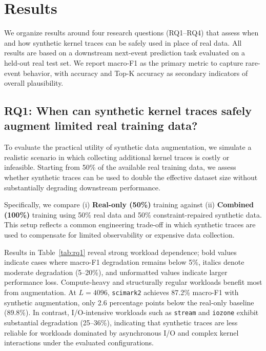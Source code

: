 \section{Results}
\label{sec:results}

We organize results around four research questions (RQ1--RQ4) that assess when and how synthetic kernel traces can be safely used in place of real data. All results are based on a downstream next-event prediction task evaluated on a held-out real test set. We report macro-F1 as the primary metric to capture rare-event behavior, with accuracy and Top-K accuracy as secondary indicators of overall plausibility.



\subsection{RQ1: When can synthetic kernel traces safely augment limited real training data?}
\label{sec:rq1}

To evaluate the practical utility of synthetic data augmentation, we simulate a realistic scenario in which collecting additional kernel traces is costly or infeasible. Starting from 50\% of the available real training data, we assess whether synthetic traces can be used to double the effective dataset size without substantially degrading downstream performance.

Specifically, we compare (i) \textbf{Real-only (50\%)} training against (ii) \textbf{Combined (100\%)} training using 50\% real data and 50\% constraint-repaired synthetic data. This setup reflects a common engineering trade-off in which synthetic traces are used to compensate for limited observability or expensive data collection.

Results in Table~\ref{tab:rq1} reveal strong workload dependence; bold values indicate cases where macro-F1 degradation remains below 5\%, italics denote moderate degradation (5--20\%), and unformatted values indicate larger performance loss.
 Compute-heavy and structurally regular workloads benefit most from augmentation. At $L=4096$, \texttt{scimark2} achieves 87.2\% macro-F1 with synthetic augmentation, only 2.6 percentage points below the real-only baseline (89.8\%). In contrast, I/O-intensive workloads such as \texttt{stream} and \texttt{iozone} exhibit substantial degradation (25--36\%), indicating that synthetic traces are less reliable for workloads dominated by asynchronous I/O and complex kernel interactions under the evaluated configurations.


